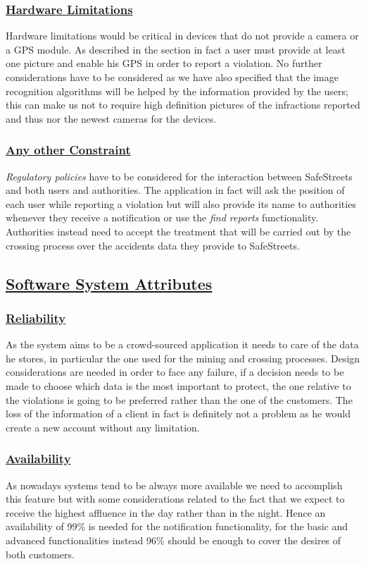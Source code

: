 		\subsubsection[Hardware Limitations]{\hyperlink{toc}{Hardware Limitations}}
			Hardware limitations would be critical in devices that do not provide a camera or a GPS module. As described in the section  in fact a user must provide at least one picture and enable his GPS in order to report a violation. No further considerations have to be considered as we have also specified that the image recognition algorithms will be helped by the information provided by the users; this can make us not to require high definition pictures of the infractions reported and thus nor the newest cameras for the devices.
		\subsubsection[Any other Constraint]{\hyperlink{toc}{Any other Constraint}}
			\emph{Regulatory policies}  have to be considered for the interaction between SafeStreets and both users and authorities. The application in fact will ask the position of each user while reporting a violation but will also provide its name to authorities whenever they receive a notification or use the \emph{find reports} functionality.
			Authorities instead need to accept the treatment that will be carried out by the crossing process over the accidents data they provide to SafeStreets.
	
	\subsection[Software System Attributes]{\hyperlink{toc}{Software System Attributes}}
		\subsubsection[Reliability]{\hyperlink{toc}{Reliability}}
			As the system aims to be a crowd-sourced application it needs to care of the data he stores, in particular the one used for the mining and crossing processes. Design considerations are needed in order to face any failure, if a decision needs to be made to choose which data is the most important to protect, the one relative to the violations is going to be preferred rather than the one of the customers. The loss of the information of a client in fact is definitely not a problem as he would create a new account without any limitation.
		\subsubsection[Availability]{\hyperlink{toc}{Availability}}
			As nowadays systems tend to be always more available we need to accomplish this feature but with some considerations related to the fact that we expect to receive the highest affluence in the day rather than in the night. Hence an availability of 99\% is needed for the notification functionality, for the basic and advanced functionalities instead 96\% should be enough to cover the desires of both customers.
